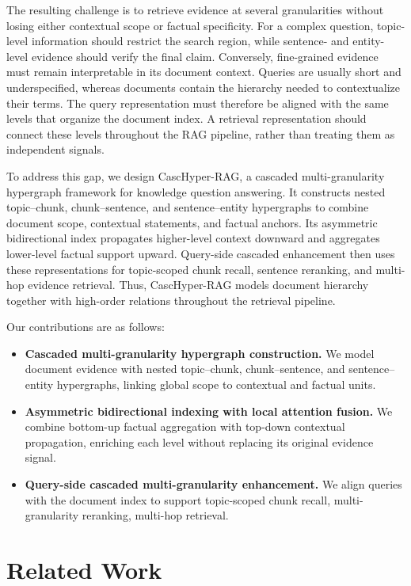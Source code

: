 \documentclass{article} %
\begin{document}
The resulting challenge is to retrieve evidence at several granularities without losing either contextual scope or factual specificity. For a complex question, topic-level information should restrict the search region, while sentence- and entity-level evidence should verify the final claim. Conversely, fine-grained evidence must remain interpretable in its document context. Queries are usually short and underspecified, whereas documents contain the hierarchy needed to contextualize their terms. The query representation must therefore be aligned with the same levels that organize the document index. A retrieval representation should connect these levels throughout the RAG pipeline, rather than treating them as independent signals.

To address this gap, we design CascHyper-RAG, a cascaded multi-granularity hypergraph framework for knowledge question answering. It constructs nested topic--chunk, chunk--sentence, and sentence--entity hypergraphs to combine document scope, contextual statements, and factual anchors. Its asymmetric bidirectional index propagates higher-level context downward and aggregates lower-level factual support upward. Query-side cascaded enhancement then uses these representations for topic-scoped chunk recall, sentence reranking, and multi-hop evidence retrieval. Thus, CascHyper-RAG models document hierarchy together with high-order relations throughout the retrieval pipeline.

Our contributions are as follows:
\begin{itemize}[leftmargin=1em,labelsep=0.45em,topsep=0pt,partopsep=0pt,itemsep=0pt,parsep=0pt]
    \item \textbf{Cascaded multi-granularity hypergraph construction.} We model document evidence with nested topic--chunk, chunk--sentence, and sentence--entity hypergraphs, linking global scope to contextual and factual units.
    \item \textbf{Asymmetric bidirectional indexing with local attention fusion.} We combine bottom-up factual aggregation with top-down contextual propagation, enriching each level without replacing its original evidence signal.
    \item \textbf{Query-side cascaded multi-granularity enhancement.} We align queries with the document index to support topic-scoped chunk recall, multi-granularity reranking, multi-hop retrieval.
\end{itemize}

\section{Related Work}\label{sec:related-work}
\end{document}
